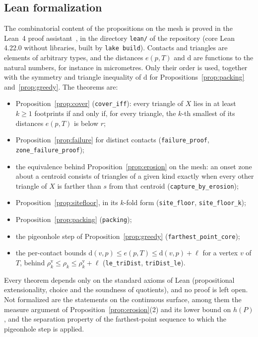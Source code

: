 \documentclass[11pt]{amsart}
\theoremstyle{definition}
\theoremstyle{remark}
\newcommand{\dd}{\mathrm{d}}
\begin{document}
\subsection*{Lean formalization}
The combinatorial content of the propositions on the mesh is proved in the
Lean~4 proof assistant~\cite{deMouraUllrich2021}, in the directory
\texttt{lean/} of the repository (core Lean 4.22.0 without libraries, built
by \texttt{lake build}). Contacts and triangles are elements of arbitrary
types, and the distances $e(p,T)$ and $\dd$ are functions to the natural
numbers, for instance in micrometres. Only their order is used, together with
the symmetry and triangle inequality of $\dd$ for
Propositions~\ref{prop:packing} and~\ref{prop:greedy}. The theorems are:
\begin{itemize}
\item Proposition~\ref{prop:cover} (\texttt{cover\_iff}): every triangle of
$X$ lies in at least $k\ge1$ footprints if and only if, for every triangle,
the $k$-th smallest of its distances $e(p,T)$ is below $r$;
\item Proposition~\ref{prop:failure} for distinct contacts
(\texttt{failure\_proof}, \texttt{zone\_failure\_proof});
\item the equivalence behind Proposition~\ref{prop:erosion} on the mesh: an
onset zone about a centroid consists of triangles of a given kind exactly when
every other triangle of $X$ is farther than $s$ from that centroid
(\texttt{capture\_by\_erosion});
\item Proposition~\ref{prop:sitefloor}, in its $k$-fold form
(\texttt{site\_floor}, \texttt{site\_floor\_k});
\item Proposition~\ref{prop:packing} (\texttt{packing});
\item the pigeonhole step of Proposition~\ref{prop:greedy}
(\texttt{farthest\_point\_core});
\item the per-contact bounds $\dd(v,p)\le e(p,T)\le\dd(v,p)+\ell$ for a
vertex $v$ of $T$, behind $\rho_k^{\mathrm{v}}\le\rho_k\le
\rho_k^{\mathrm{v}}+\ell$ (\texttt{le\_triDist}, \texttt{triDist\_le}).
\end{itemize}
Every theorem depends only on the standard axioms of Lean (propositional
extensionality, choice and the soundness of quotients), and no proof is left
open. Not formalized are the statements on the continuous surface, among them
the measure argument of Proposition~\ref{prop:erosion}(2) and its lower bound
on $h(P)$, and the separation property of the farthest-point sequence to which
the pigeonhole step is applied.
\end{document}
